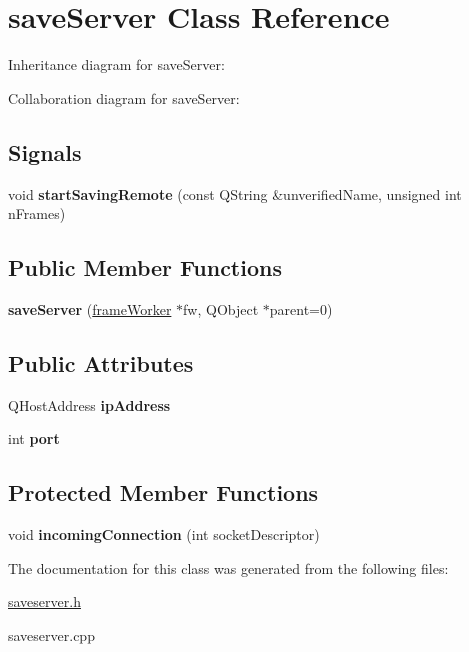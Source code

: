 \hypertarget{classsaveServer}{\section{save\+Server Class Reference}
\label{classsaveServer}
}


Inheritance diagram for save\+Server\+:


Collaboration diagram for save\+Server\+:
\subsection*{Signals}
\begin{DoxyCompactItemize}
\item 
\hypertarget{classsaveServer_abb95bca71b26554465ab78909e1611af}{void {\bfseries start\+Saving\+Remote} (const Q\+String \&unverified\+Name, unsigned int n\+Frames)}\label{classsaveServer_abb95bca71b26554465ab78909e1611af}

\end{DoxyCompactItemize}
\subsection*{Public Member Functions}
\begin{DoxyCompactItemize}
\item 
\hypertarget{classsaveServer_a5dc7b9531f28c2f6317ad80c7636111c}{{\bfseries save\+Server} (\hyperlink{classframeWorker}{frame\+Worker} $\ast$fw, Q\+Object $\ast$parent=0)}\label{classsaveServer_a5dc7b9531f28c2f6317ad80c7636111c}

\end{DoxyCompactItemize}
\subsection*{Public Attributes}
\begin{DoxyCompactItemize}
\item 
\hypertarget{classsaveServer_aa3e64d128812893fe169ab1608d8a1f9}{Q\+Host\+Address {\bfseries ip\+Address}}\label{classsaveServer_aa3e64d128812893fe169ab1608d8a1f9}

\item 
\hypertarget{classsaveServer_a49c35e55c8dc7dc98af841a587532d5f}{int {\bfseries port}}\label{classsaveServer_a49c35e55c8dc7dc98af841a587532d5f}

\end{DoxyCompactItemize}
\subsection*{Protected Member Functions}
\begin{DoxyCompactItemize}
\item 
\hypertarget{classsaveServer_ab9d90427a8a20fa8938603f347574161}{void {\bfseries incoming\+Connection} (int socket\+Descriptor)}\label{classsaveServer_ab9d90427a8a20fa8938603f347574161}

\end{DoxyCompactItemize}


The documentation for this class was generated from the following files\+:\begin{DoxyCompactItemize}
\item 
\hyperlink{saveserver_8h}{saveserver.\+h}\item 
saveserver.\+cpp\end{DoxyCompactItemize}
